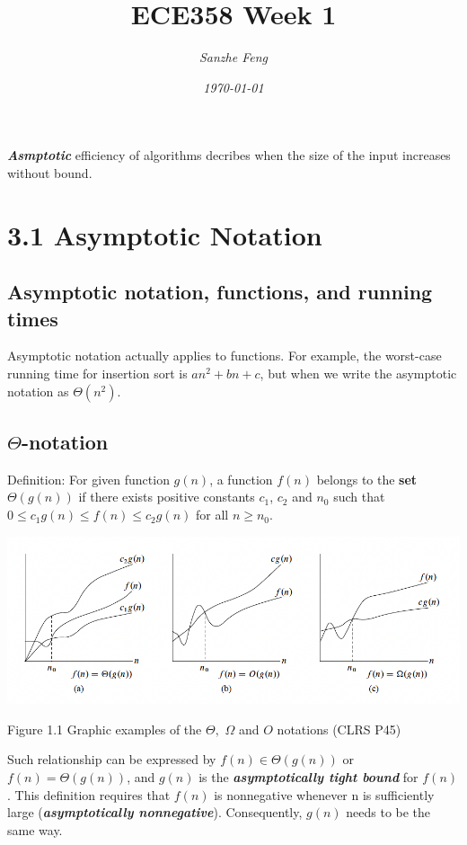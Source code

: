 \documentclass{article}
\begin{document}
\begin{titlepage}
	

\title{\textbf{ECE358 Week 1}}
\author{\textit{Sanzhe Feng}}
\date{\textit{\today}}
\maketitle
\end{titlepage}
\setlength{\parindent}{0pt}

\textbf{\emph{Asmptotic}} efficiency of algorithms decribes when the size of the input increases without bound.

\section*{3.1 Asymptotic Notation}

\subsection*{Asymptotic notation, functions, and running times}
Asymptotic notation actually applies to functions. For example, the worst-case running time for insertion sort is $an^2+bn+c$, but when we write the asymptotic notation as $\Theta(n^2)$.
\subsection*{$\Theta$-notation}
Definition: For given function $g(n)$, a function $f(n)$ belongs to the \textbf{set} $\Theta(g(n))$ if there exists positive constants $c_1$, $c_2$ and $n_0$ such that $0 \leq c_1g(n)\leq f(n)\leq c_2g(n)$ for all $n \geq n_0$.

\includegraphics[width=1\linewidth]{P45_3.1.png}
\begin{center}
\small{Figure 1.1 Graphic examples of the $\Theta,$ $\Omega$ and $O$ notations (CLRS P45)}	
\end{center}

Such relationship can be expressed by $f(n) \in \Theta(g(n))$ or $f(n) = \Theta(g(n))$, and $g(n)$ is the \textbf{\textit{asymptotically tight bound}} for $f(n)$. This definition requires that $f(n)$ is nonnegative whenever n is sufficiently large (\emph{\textbf{asymptotically nonnegative}}). Consequently, $g(n)$ needs to be the same way. \\
\end{document}
